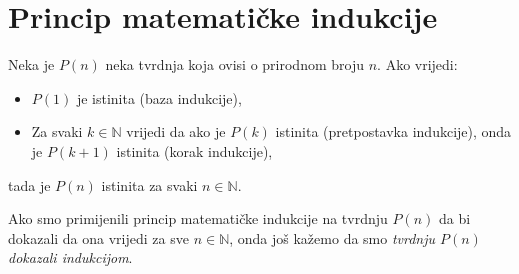 \section{Princip matematičke indukcije}
\begin{remark}
\label{20}
Neka je $P(n)$ neka tvrdnja koja ovisi o prirodnom broju $n$. Ako vrijedi:
\begin{itemize}
\item $P(1)$ je istinita (baza indukcije),
\item Za svaki $k\in \mathbb{N}$ vrijedi da ako je $P(k)$ istinita (pretpostavka indukcije), onda je $P(k+1)$ istinita (korak indukcije),
\end{itemize}
tada je $P(n)$ istinita za svaki $n\in \mathbb{N}$.
\end{remark}

\begin{remark}
\label{22}
Ako smo primijenili princip matematičke indukcije na tvrdnju $P(n)$ da bi dokazali da ona vrijedi za sve $n\in \mathbb{N}$, onda još kažemo da smo \textit{tvrdnju $P(n)$ dokazali indukcijom}.
\end{remark}

